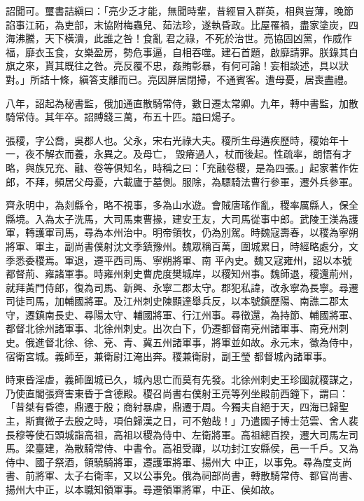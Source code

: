 \begin{pinyinscope}
 詔聞可。璽書詰縝曰：「亮少乏才能，無聞時輩，昔經冒入群英，相與豈薄，晚節諂事江祏，為吏部，末協附梅蟲兒、茹法珍，遂執昏政。比屋罹禍，盡家塗炭，四海沸騰，天下橫潰，此誰之咎！食亂
 君之祿，不死於治世。亮協固凶黨，作威作福，靡衣玉食，女樂盈房，勢危事逼，自相吞噬。建石首題，啟靡請罪。朕錄其白旗之來，貰其既往之咎。亮反覆不忠，姦賄彰暴，有何可論！妄相談述，具以狀對。」所詰十條，縝答支離而已。亮因屏居閉掃，不通賓客。遭母憂，居喪盡禮。



 八年，詔起為秘書監，俄加通直散騎常侍，數日遷太常卿。九年，轉中書監，加散騎常侍。其年卒。詔賻錢三萬，布五十匹。謚曰煬子。



 張稷，字公喬，吳郡人也。父永，宋右光祿大夫。稷所生母遘疾歷時，稷始年十一，夜不解衣而養，永異之。及母亡，
 毀瘠過人，杖而後起。性疏率，朗悟有才略，與族兄充、融、卷等俱知名，時稱之曰：「充融卷稷，是為四張。」起家著作佐郎，不拜，頻居父母憂，六載廬于墓側。服除，為驃騎法曹行參軍，遷外兵參軍。



 齊永明中，為剡縣令，略不視事，多為山水遊。會賊唐瑤作亂，稷率厲縣人，保全縣境。入為太子洗馬，大司馬東曹掾，建安王友，大司馬從事中郎。武陵王渼為護軍，轉護軍司馬，尋為本州治中。明帝領牧，仍為別駕。時魏寇壽春，以稷為寧朔將軍、軍主，副尚書僕射沈文季鎮豫州。魏眾稱百萬，圍城累日，時經略處分，文季悉委稷焉。軍退，遷平西司馬、寧朔將軍、南
 平內史。魏又寇雍州，詔以本號都督荊、雍諸軍事。時雍州刺史曹虎度樊城岸，以稷知州事。魏師退，稷還荊州，就拜黃門侍郎，復為司馬、新興、永寧二郡太守。郡犯私諱，改永寧為長寧。尋遷司徒司馬，加輔國將軍。及江州刺史陳顯達舉兵反，以本號鎮歷陽、南譙二郡太守，遷鎮南長史、尋陽太守、輔國將軍、行江州事。尋徵還，為持節、輔國將軍、都督北徐州諸軍事、北徐州刺史。出次白下，仍遷都督南兗州諸軍事、南兗州刺史。俄進督北徐、徐、兗、青、冀五州諸軍事，將軍並如故。永元末，徵為侍中，宿衛宮城。義師至，兼衛尉江淹出奔。稷兼衛尉，副王瑩
 都督城內諸軍事。



 時東昏淫虐，義師圍城已久，城內思亡而莫有先發。北徐州刺史王珍國就稷謀之，乃使直閣張齊害東昏于含德殿。稷召尚書右僕射王亮等列坐殿前西鐘下，謂曰：「昔桀有昏德，鼎遷于殷；商紂暴虐，鼎遷于周。今獨夫自絕于天，四海已歸聖主，斯實微子去殷之時，項伯歸漢之日，可不勉哉！」乃遣國子博士范雲、舍人裴長穆等使石頭城詣高祖，高祖以稷為侍中、左衛將軍。高祖總百揆，遷大司馬左司馬。梁臺建，為散騎常侍、中書令。高祖受禪，以功封江安縣侯，邑一千戶。又為侍中、國子祭酒，領驍騎將軍，遷護軍將軍、揚州大
 中正，以事免。尋為度支尚書、前將軍、太子右衛率，又以公事免。俄為祠部尚書，轉散騎常侍、都官尚書、揚州大中正，以本職知領軍事。尋遷領軍將軍，中正、侯如故。




\end{pinyinscope}
